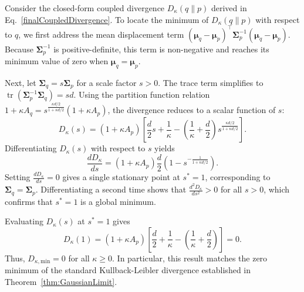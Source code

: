 \documentclass[twoside,11pt]{article}
\renewenvironment{proof}{\par\noindent{\bf Proof\ }}{\hfill\BlackBox\par\vspace{2mm}}
\begin{document}
\begin{proof}
Consider the closed-form coupled divergence $D_\kappa(q \parallel p)$ derived in Eq.~\eqref{finalCoupledDivergence}. To locate the minimum of $D_\kappa(q \parallel p)$ with respect to $q$, we first address the mean displacement term $(\boldsymbol{\mu}_q - \boldsymbol{\mu}_p)^\top \boldsymbol{\Sigma}_p^{-1} (\boldsymbol{\mu}_q - \boldsymbol{\mu}_p)$. Because $\boldsymbol{\Sigma}_p^{-1}$ is positive-definite, this term is non-negative and reaches its minimum value of zero when $\boldsymbol{\mu}_q = \boldsymbol{\mu}_p$.

Next, let $\boldsymbol{\Sigma}_q = s \boldsymbol{\Sigma}_p$ for a scale factor $s > 0$. The trace term simplifies to $\operatorname{tr}(\boldsymbol{\Sigma}_p^{-1} \boldsymbol{\Sigma}_q) = s d$. Using the partition function relation $1 + \kappa A_q = s^{\frac{\kappa d / 2}{1 + \kappa d / 2}} (1 + \kappa A_p)$, the divergence reduces to a scalar function of $s$:
\[
D_\kappa(s) = (1 + \kappa A_p) \left[ \frac{d}{2} s + \frac{1}{\kappa} - \left( \frac{1}{\kappa} + \frac{d}{2} \right) s^{\frac{\kappa d / 2}{1 + \kappa d / 2}} \right].
\]
Differentiating $D_\kappa(s)$ with respect to $s$ yields
\[
\frac{d D_\kappa}{ds} = (1 + \kappa A_p) \frac{d}{2} \left( 1 - s^{-\frac{1}{1 + \kappa d / 2}} \right).
\]
Setting $\frac{d D_\kappa}{ds} = 0$ gives a single stationary point at $s^* = 1$, corresponding to $\boldsymbol{\Sigma}_q = \boldsymbol{\Sigma}_p$. Differentiating a second time shows that $\frac{d^2 D_\kappa}{ds^2} > 0$ for all $s > 0$, which confirms that $s^* = 1$ is a global minimum. 

Evaluating $D_\kappa(s)$ at $s^* = 1$ gives
\[
D_\kappa(1) = (1 + \kappa A_p) \left[ \frac{d}{2} + \frac{1}{\kappa} - \left( \frac{1}{\kappa} + \frac{d}{2} \right) \right] = 0.
\]
Thus, $D_{\kappa,\text{min}} = 0$ for all $\kappa \ge 0$. In particular, this result matches the zero minimum of the standard Kullback-Leibler divergence established in Theorem~\ref{thm:GaussianLimit}.
\end{proof}
\end{document}
